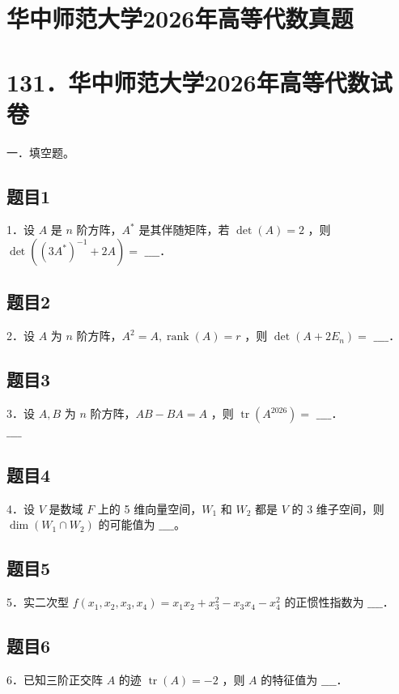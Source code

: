 \documentclass{article}
\begin{document}
\section*{华中师范大学2026年高等代数真题}
\section*{131．华中师范大学2026年高等代数试卷}
一．填空题。\\

\subsection{题目1}
1．设 \(A\) 是 \(n\) 阶方阵，\(A^{*}\) 是其伴随矩阵，若 \(\operatorname{det}(A)=2\) ，则 \(\operatorname{det}\left(\left(3 A^{*}\right)^{-1}+2 A\right)=\) \(\_\_\_\_\)．

\subsection{题目2}
2．设 \(A\) 为 \(n\) 阶方阵，\(A^{2}=A, \operatorname{rank}(A)=r\) ，则 \(\operatorname{det}\left(A+2 E_{n}\right)=\) \(\_\_\_\_\)．

\subsection{题目3}
3．设 \(A, B\) 为 \(n\) 阶方阵，\(A B-B A=A\) ，则 \(\operatorname{tr}\left(A^{2026}\right)=\) \(\_\_\_\_\)．\\
\(\_\_\_\_\)

\subsection{题目4}
4．设 \(V\) 是数域 \(F\) 上的 5 维向量空间，\(W_{1}\) 和 \(W_{2}\) 都是 \(V\) 的 3 维子空间，则 \(\operatorname{dim}\left(W_{1} \cap W_{2}\right)\) 的可能值为 \(\_\_\_\_\)。

\subsection{题目5}
5．实二次型 \(f\left(x_{1}, x_{2}, x_{3}, x_{4}\right)=x_{1} x_{2}+x_{3}^{2}-x_{3} x_{4}-x_{4}^{2}\) 的正惯性指数为 \(\_\_\_\_\)．

\subsection{题目6}
6．已知三阶正交阵 \(A\) 的迹 \(\operatorname{tr}(A)=-2\) ，则 \(A\) 的特征值为 \(\_\_\_\_\)．
\end{document}
